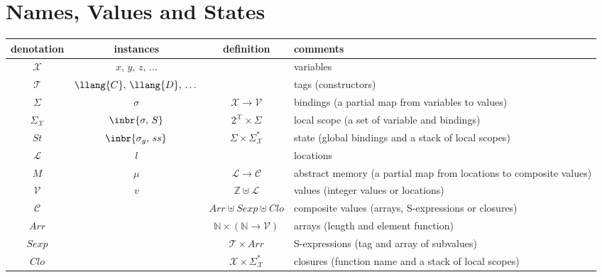 \section{Names, Values and States}

\begin{table}[t]
  \begin{tabular}{cccl}
    denotation         & instances                       & definition                                 & comments \\
    \hline
    $\mathscr X$       & $x,\,y,\,z,\,\dots$             &                                            & variables \\
    $\mathscr T$       & $\llang{C},\,\llang{D},\,\dots$ &                                            & tags (constructors) \\
    $\Sigma$           & $\sigma$                        & $\mathscr X\to\mathscr V$                  & bindings (a partial map from variables to values) \\
    $\Sigma_{\mathscr X}$ & $\inbr{\sigma,\,S}$             & $2^{\mathscr X}\times\Sigma$                 & local scope (a set of variable and bindings) \\
    $St$               & $\inbr{\sigma_g,\,ss}$          & $\Sigma\times\Sigma^*_{\mathscr X}$           & state (global bindings and a stack of local scopes) \\
    $\mathscr L$       & $l$                             &                                            & locations \\
    $M$                & $\mu$                           & $\mathscr L\to\mathscr C$                  & abstract memory (a partial map from locations to composite values) \\
    $\mathscr V$       & $v$                             & $\mathbb Z\uplus \mathscr L$               & values (integer values or locations) \\
    $\mathscr C$       &                                 & $Arr\uplus Sexp \uplus Clo$                & composite values (arrays, S-expressions or closures) \\
    $Arr$              &                                 & $\mathbb N\times (\mathbb N\to\mathscr V)$ & arrays (length and element function) \\
    $Sexp$             &                                 & $\mathscr T \times Arr$                    & S-expressions (tag and array of subvalues) \\
    $Clo$              &                                 & $\mathscr X \times \Sigma^*_{\mathscr X}$     & closures (function name and a stack of local scopes) 
  \end{tabular}
\end{table}
